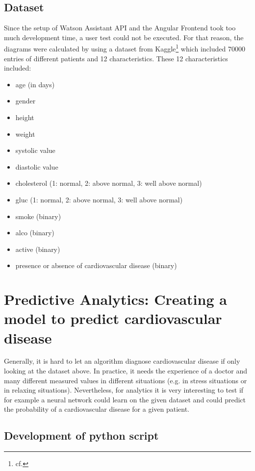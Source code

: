 \subsection{Dataset}
Since the setup of Watson Assistant API and the Angular Frontend took too much development time, a user test could not be executed. For that reason, the diagrams were calculated by using a dataset from Kaggle\footnote{cf.\autocite{kaggle}} which included 70000 entries of different patients and 12 characteristics. These 12 characteristics included:
\begin{itemize}
\setlength\itemsep{-0.5em}
  \item age (in days)
  \item gender
  \item height
  \item weight
  \item systolic value
  \item diastolic value
  \item cholesterol (1: normal, 2: above normal, 3: well above normal)
  \item gluc (1: normal, 2: above normal, 3: well above normal)
  \item smoke (binary)
  \item alco (binary)
  \item active (binary)
  \item presence or absence of cardiovascular disease (binary) 
\end{itemize}


  


\section{Predictive Analytics: Creating a model to predict cardiovascular disease} \label{predict}
Generally, it is hard to let an algorithm diagnose cardiovascular disease if only looking at the dataset above. In practice, it needs the experience of a doctor and many different measured values in different situations (e.g. in stress situations or in relaxing situations). Nevertheless, for analytics it is very interesting to test if for example a neural network could learn on the given dataset and could predict the probability of a cardiovascular disease for a given patient. 

\subsection{Development of python script}

